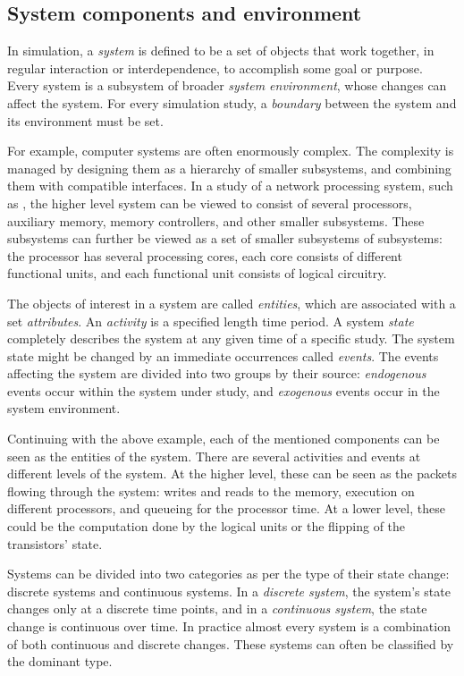 \subsection{System components and environment}
\label{sec:syst-comp-envir}

In simulation, a \emph{system} is defined to be a set of objects that work together, in regular interaction or interdependence, to accomplish some goal or purpose. Every system is a subsystem of broader \emph{system environment}, whose changes can affect the system. For every simulation study, a \emph{boundary} between the system and its environment must be set. \cite{Banks:2010:DES}

For example, computer systems are often enormously complex. The complexity is managed by designing them as a hierarchy of smaller subsystems, and combining them with compatible interfaces. In a study of a network processing system, such as \cite{cavium OCTEON}, the higher level system can be viewed to consist of several processors, auxiliary memory, memory controllers, and other smaller subsystems. These subsystems can further be viewed as a set of smaller subsystems of subsystems: the processor has several processing cores, each core consists of different functional units, and each functional unit consists of logical circuitry. \cite{Banks:2010:DES}

The objects of interest in a system are called \emph{entities}, which are associated with a set \emph{attributes}. An \emph{activity} is a specified length time period. A system \emph{state} completely describes the system at any given time of a specific study. The system state might be changed by an immediate occurrences called \emph{events}. The events affecting the system are divided into two groups by their source: \emph{endogenous} events occur within the system under study, and \emph{exogenous} events occur in the system environment. \cite{Banks:2010:DES}

Continuing with the above example, each of the mentioned components can be seen as the entities of the system. There are several activities and events at different levels of the system. At the higher level, these can be seen as the packets flowing through the system: writes and reads to the memory, execution on different processors, and queueing for the processor time. At a lower level, these could be the computation done by the logical units or the flipping of the transistors' state.

Systems can be divided into two categories as per the type of their state change: discrete systems and continuous systems. In a \emph{discrete system}, the system's state changes only at a discrete time points, and in a \emph{continuous system}, the state change is continuous over time. In practice almost every system is a combination of both continuous and discrete changes. These systems can often be classified by the dominant type. \cite{Banks:2010:DES}

